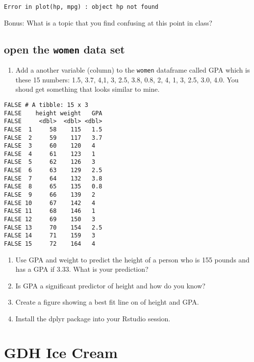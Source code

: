 \documentclass[
]{book}
\providecommand{\tightlist}{%
  \setlength{\itemsep}{0pt}\setlength{\parskip}{0pt}}
\begin{document}
\texttt{Error\ in\ plot(hp,\ mpg)\ :\ object\ \textquotesingle{}hp\textquotesingle{}\ not\ found}

Bonus: What is a topic that you find confusing at this point in class?

\hypertarget{open-the-women-data-set}{%
\section{\texorpdfstring{open the \texttt{women} data set}{open the women data set}}\label{open-the-women-data-set}}

\begin{enumerate}
\def\labelenumi{\arabic{enumi}.}
\tightlist
\item
  Add a another variable (column) to the \texttt{women} dataframe called GPA which is these 15 numbers: 1.5, 3.7, 4,1, 3, 2.5, 3.8, 0.8, 2, 4, 1, 3, 2.5, 3.0, 4.0. You shoud get something that looks similar to mine.
\end{enumerate}

\begin{verbatim}
FALSE # A tibble: 15 x 3
FALSE    height weight   GPA
FALSE     <dbl>  <dbl> <dbl>
FALSE  1     58    115   1.5
FALSE  2     59    117   3.7
FALSE  3     60    120   4  
FALSE  4     61    123   1  
FALSE  5     62    126   3  
FALSE  6     63    129   2.5
FALSE  7     64    132   3.8
FALSE  8     65    135   0.8
FALSE  9     66    139   2  
FALSE 10     67    142   4  
FALSE 11     68    146   1  
FALSE 12     69    150   3  
FALSE 13     70    154   2.5
FALSE 14     71    159   3  
FALSE 15     72    164   4
\end{verbatim}

\begin{enumerate}
\def\labelenumi{\arabic{enumi}.}
\setcounter{enumi}{1}
\item
  Use GPA and weight to predict the height of a person who is 155 pounds and has a GPA if 3.33. What is your prediction?
\item
  Is GPA a significant predictor of height and how do you know?
\item
  Create a figure showing a best fit line on of height and GPA.
\item
  Install the dplyr package into your Rstudio session.
\end{enumerate}

\hypertarget{gdh-ice-cream}{%
\chapter{GDH Ice Cream}\label{gdh-ice-cream}}
\end{document}

